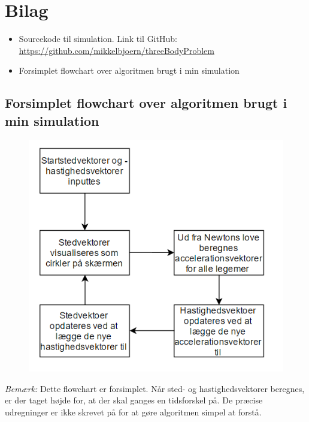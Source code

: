 \documentclass[12pt,a4paper]{article}
\theoremstyle{break}
\theoremstyle{nonumberplain}
\begin{document}
\section{Bilag}
\begin{itemize}
	\item Sourcekode til simulation. Link til GitHub:\\ \url{https://github.com/mikkelbjoern/threeBodyProblem}
	\item Forsimplet flowchart over algoritmen brugt i min simulation
	
\end{itemize}



\subsection*{Forsimplet flowchart over algoritmen brugt i min simulation}

\begin{figure}[h]
\begin{center}
\includegraphics[scale=1]{algorithm}
\end{center}
\end{figure}

\textit{Bemærk:} Dette flowchart er forsimplet.
Når sted- og hastighedsvektorer beregnes, er der taget højde for, at der skal ganges en tidsforskel på. 
De præcise udregninger er ikke skrevet på for at gøre algoritmen simpel at forstå.
\end{document}
